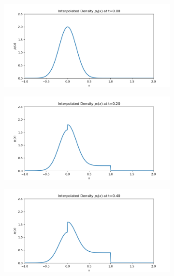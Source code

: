 \documentclass[a4paper,12pt]{article}
\begin{document}
\begin{figure}[htbp]
    \centering
    \begin{subfigure}[b]{0.45\textwidth}
      \includegraphics[width=\linewidth]{frames/frame_1.png}
      \caption{}
    \end{subfigure}
    \hfill
    \begin{subfigure}[b]{0.45\textwidth}
      \includegraphics[width=\linewidth]{frames/frame_2.png}
      \caption{}
    \end{subfigure}
    \par\medskip
    \begin{subfigure}[b]{0.45\textwidth}
      \includegraphics[width=\linewidth]{frames/frame_3.png}

\end{subfigure}
\end{figure}
\end{document}
